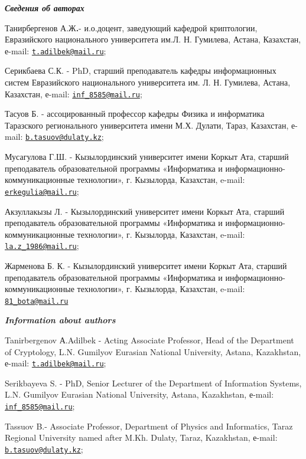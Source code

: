\begin{authorinfo}
\emph{{\bfseries Сведения об авторах}}

Танирбергенов А.Ж{\bfseries .}- и.о.доцент, заведующий кафедрой
криптологии, Евразийского национального университета им.Л. Н. Гумилева,
Астана, Казахстан, е-mail:
\href{mailto:t.adilbek@mail.ru}{\nolinkurl{t.adilbek@mail.ru}};

Серикбаева С.К. - PhD, старший преподаватель кафедры информационных
систем Евразийского национального университета им. Л. Н. Гумилева,
Астана, Казахстан, е-mail:
\href{mailto:inf_8585@mail.ru}{\nolinkurl{inf\_8585@mail.ru}};

Тасуов Б. - ассоцированный профессор кафедры Физика и информатика
Таразского регионального университета имени М.Х. Дулати, Тараз,
Казахстан, е-mail:
\href{mailto:b.tasuov@dulaty.kz}{\nolinkurl{b.tasuov@dulaty.kz}};

Мусагулова Г.Ш. - Кызылординский университет имени Коркыт Ата, старший
преподаватель образовательной программы «Информатика и
информационно-коммуникационные технологии», г. Кызылорда, Казахстан,
e-mail: \\\href{mailto:erkegulia@mail.ru}{\nolinkurl{erkegulia@mail.ru}};

Акзуллакызы Л. - Кызылординский университет имени Коркыт Ата, старший
преподаватель образовательной программы «Информатика и
информационно-коммуникационные технологии», г. Кызылорда, Казахстан,
e-mail: \\\href{mailto:la.z_1986@mail.ru}{\nolinkurl{la.z\_1986@mail.ru}};

Жарменова Б. К. - Кызылординский университет имени Коркыт Ата, старший
преподаватель образовательной программы «Информатика и
информационно-коммуникационные технологии», г. Кызылорда, Казахстан,
e-mail: \\\href{mailto:81_bota@mail.ru}{\nolinkurl{81\_bota@mail.ru}}

\emph{{\bfseries Information about authors}}

Tanirbergenov А.Adilbek - Acting Associate Professor, Head of the
Department of Cryptology, L.N. Gumilyov Eurasian National University,
Astana, Kazakhstan, е-mail:
\href{mailto:t.adilbek@mail.ru}{\nolinkurl{t.adilbek@mail.ru}};

Serikbayeva S. - PhD, Senior Lecturer of the Department of Information
Systems, L.N. Gumilyov Eurasian National University, Astana, Kazakhstan,
е-mail: \href{mailto:inf_8585@mail.ru}{\nolinkurl{inf\_8585@mail.ru}};

Tassuov B.- Associate Professor, Department of Physics and Informatics,
Taraz Regional University named after M.Kh. Dulaty, Taraz, Kazakhstan,
е-mail:
\href{mailto:b.tasuov@dulaty.kz}{\nolinkurl{b.tasuov@dulaty.kz}};


\end{authorinfo}
